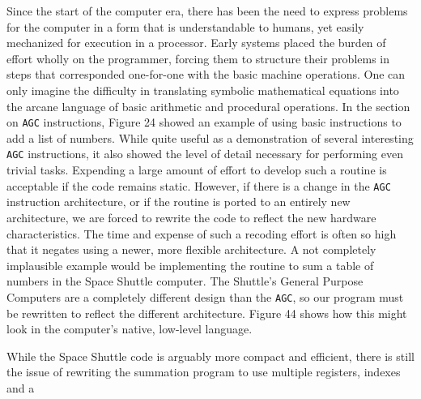 \documentclass[refcap, oxford]{ahsan}
\begin{document}
Since the start of the computer era, there has been the need to express problems for the computer in a form that is understandable to humans, yet easily mechanized for execution in a processor. Early systems placed the burden of effort wholly on the programmer, forcing them to structure their problems in steps that corresponded one-for-one with the basic machine operations. One can only imagine the difficulty in translating symbolic mathematical equations into the arcane language of basic arithmetic and procedural operations. In the section on \texttt{AGC} instructions, Figure 24 showed an example of using basic instructions to add a list of numbers. While quite useful as a demonstration of several interesting \texttt{AGC} instructions, it also showed the level of detail necessary for performing even trivial tasks. Expending a large amount of effort to develop such a routine is acceptable if the code remains static. However, if there is a change in the \texttt{AGC} instruction architecture, or if the routine is ported to an entirely new architecture, we are forced to rewrite the code to reflect the new hardware characteristics. The time and expense of such a recoding effort is often so high that it negates using a newer, more flexible architecture. A not completely implausible example would be implementing the routine to sum a table of numbers in the Space Shuttle computer. The Shuttle's General Purpose Computers are a completely different design than the \texttt{AGC}, so our program must be rewritten to reflect the different architecture. Figure 44 shows how this might look in the computer's native, low-level language. 

While the Space Shuttle code is arguably more compact and efficient, there is still the issue of rewriting the summation program to use multiple registers, indexes and a
\end{document}
